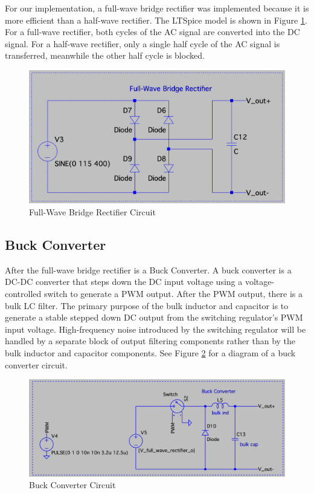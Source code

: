 \documentclass[conference]{IEEEtran}
\begin{document}
For our implementation, a full-wave bridge rectifier was implemented because it is more efficient than a half-wave rectifier. The LTSpice model is shown in Figure \ref{fig:full-wave_bridge_rectifier_circuit_diagram}. For a full-wave rectifier, both cycles of the AC signal are converted into the DC signal. For a half-wave rectifier, only a single half cycle of the AC signal is transferred, meanwhile the other half cycle is blocked. 

\begin{figure}[htp]
    \centering
    \includegraphics[width=1.0\linewidth]{full-wave_bridge_rectifier_circuit.png}
    \caption{Full-Wave Bridge Rectifier Circuit}
    \label{fig:full-wave_bridge_rectifier_circuit_diagram}
\end{figure}

\subsection{Buck Converter}
After the full-wave bridge rectifier is a Buck Converter. A buck converter is a DC-DC converter that steps down the DC input voltage using a voltage-controlled switch to generate a PWM output. After the PWM output, there is a bulk LC filter. The primary purpose of the bulk inductor and capacitor is to generate a stable stepped down DC output from the switching regulator's PWM input voltage. High-frequency noise introduced by the switching regulator will be handled by a separate block of output filtering components rather than by the bulk inductor and capacitor components. See Figure \ref{fig:buck_converter_circuit_diagram} for a diagram of a buck converter circuit.

\begin{figure}[htp]
    \centering
    \includegraphics[width=1.0\linewidth]{buck_converter_circuit.png}
    \caption{Buck Converter Circuit}
    \label{fig:buck_converter_circuit_diagram}
\end{figure}
\end{document}
